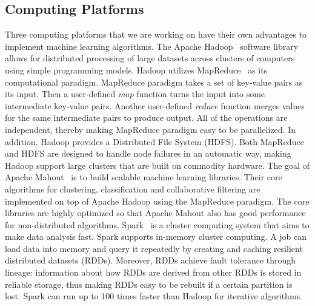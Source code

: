 \documentclass[10pt, conference, compsocconf]{IEEEtran}
\begin{document}
\subsection{Computing Platforms}\label{sec:platform}
Three computing platforms that we are working on have their own advantages to implement machine learning algorithms.
The Apache Hadoop~\cite{white2012hadoop} software library allows for distributed processing of large datasets across clusters of computers using simple programming models.
Hadoop utilizes MapReduce~\cite{dean2008mapreduce} as its computational paradigm.
MapReduce paradigm takes a set of key-value pairs as its input.
Then a user-defined \textit{map} function turns the input into some intermediate key-value pairs.
Another user-defined \textit{reduce} function merges values for the same intermediate pairs to produce output.
All of the operations are independent, thereby making MapReduce paradigm easy to be parallelized.
In addition, Hadoop provides a Distributed File System (HDFS).
Both MapReduce and HDFS are designed to handle node failures in an automatic way, making Hadoop support large clusters that are built on commodity hardware.
The goal of Apache Mahout~\cite{mahoutscalable} is to build scalable machine learning libraries. Their core algorithms for clustering, classification and collaborative filtering are implemented on top of Apache Hadoop using the MapReduce paradigm. The core libraries are highly optimized so that Apache Mahout also has good performance for non-distributed algorithms.
Spark~\cite{zaharia2010spark} is a cluster computing system that aims to make data analysis fast.
Spark supports in-memory cluster computing. A job can load data into memory and query it repeatedly by creating and caching resilient distributed datasets (RDDs).
Moreover, RDDs achieve fault tolerance through lineage: information about how RDDs are derived from other RDDs is stored in reliable storage, thus making RDDs easy to be rebuilt if a certain partition is lost.
Spark can run up to 100 times faster than Hadoop for iterative algorithms.
\end{document}
